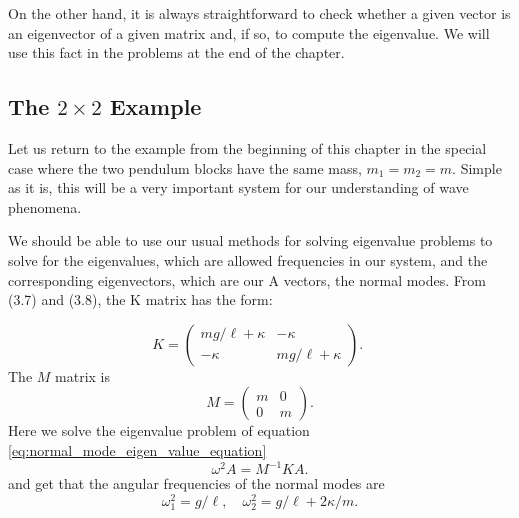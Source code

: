 \documentclass[main.tex]{subfiles}
\begin{document}
On the other hand, it is always straightforward to check whether a given vector is an eigenvector of a given matrix and, if so, to compute the eigenvalue. We will use this fact in the problems at the end of the chapter.

\subsection{The $2 \times 2$ Example}
Let us return to the example from the beginning of this chapter in the special case where the two pendulum blocks have the same mass, $m_1=m_2=m$. Simple as it is, this will be a very important system for our understanding of wave phenomena. 

We should be able to use our usual methods for solving eigenvalue problems to solve for the eigenvalues, which are allowed frequencies in our system, and the corresponding eigenvectors, which are our A vectors, the normal modes. From (3.7) and (3.8), the K matrix has the form: 

$$
K=\left(\begin{array}{cc}
m g / \ell+\kappa & -\kappa \\
-\kappa & m g / \ell+\kappa
\end{array}\right) \text {. }
$$
The $M$ matrix is
$$
M=\left(\begin{array}{cc}
m & 0 \\
0 & m
\end{array}\right) .
$$
Here we solve the eigenvalue problem of equation \ref{eq:normal_mode_eigen_value_equation} 
\begin{equation*}
    \label{eq:normal_mode_eigen_value_equation}
\omega^2 A=M^{-1} K A .
\end{equation*}
and get that the angular frequencies of the normal modes are
$$
\omega_1^2=g / \ell, \quad \omega_2^2=g / \ell+2 \kappa / m.
$$
\end{document}
